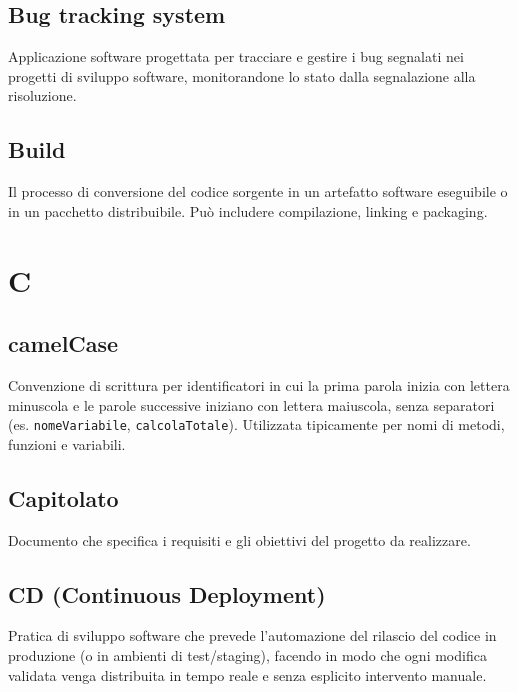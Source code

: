 \documentclass[a4paper, 11pt, oneside]{scrartcl} %
\begin{document}
\subsection*{Bug tracking system}
Applicazione software progettata per tracciare e gestire i bug segnalati nei progetti di sviluppo software, monitorandone lo stato dalla segnalazione alla risoluzione.
\vspace{0.5cm}

\subsection*{Build}
Il processo di conversione del codice sorgente in un artefatto software eseguibile o in un pacchetto distribuibile. Può includere compilazione, linking e packaging.
\vspace{0.5cm}



\section*{C}


\subsection*{camelCase}
Convenzione di scrittura per identificatori in cui la prima parola inizia con lettera minuscola e le parole successive iniziano con lettera maiuscola, senza separatori (es. \texttt{nomeVariabile}, \texttt{calcolaTotale}). Utilizzata tipicamente per nomi di metodi, funzioni e variabili.
\vspace{0.5cm}

\subsection*{Capitolato}
Documento che specifica i requisiti e gli obiettivi del progetto da realizzare.
\vspace{0.5cm}

\subsection*{CD (Continuous Deployment)}
Pratica di sviluppo software che prevede l'automazione del rilascio del codice in produzione (o in ambienti di test/staging), facendo in modo che ogni modifica validata venga distribuita in tempo reale e senza esplicito intervento manuale.
\vspace{0.5cm}
\end{document}
